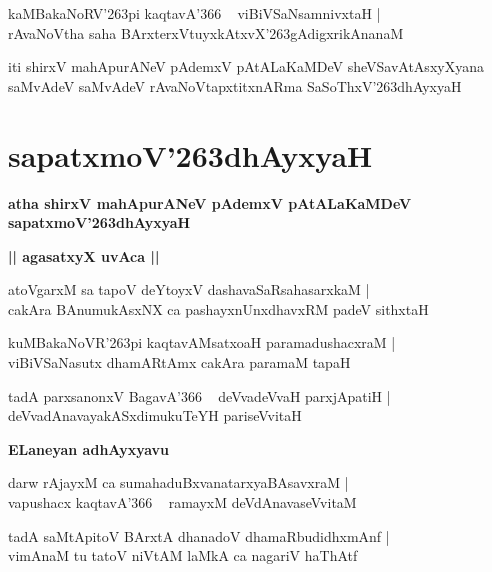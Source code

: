 \documentclass[twoside,12pt,openright]{book}
\def\S{\char'263}
\newcounter{shloka}[chapter]
\def\uvaca#1{\centerline{{\large\textbf{#1}}}}
\begin{document}
\begin{shloka}%
kaMBakaNoRV\S pi kaqtavA\char'366 ~ viBiVSaNsamnivxtaH |\\
rAvaNoVtha saha BArxterxVtuyxkAtxvX\S gAdigxrikAnanaM 
\end{shloka}

\begin{center}
iti shirxV mahApurANeV pAdemxV pAtALaKaMDeV sheVSavAtAsxyXyana saMvAdeV 
saMvAdeV rAvaNoVtapxtitxnARma SaSoThxV\S dhAyxyaH
\end{center}

\chapter{sapatxmoV\S dhAyxyaH}

\begin{center}
{\LARGE\bfseries atha shirxV mahApurANeV pAdemxV pAtALaKaMDeV sapatxmoV\S dhAyxyaH}
\end{center}

\uvaca{|| agasatxyX uvAca ||}

\begin{shloka}%
atoVgarxM sa tapoV deYtoyxV dashavaSaRsahasarxkaM |\\
cakAra BAnumukAsxNX ca pashayxnUnxdhavxRM padeV sithxtaH 
\end{shloka}

\begin{shloka}%
kuMBakaNoVR\S pi kaqtavAMsatxoaH paramadushacxraM |\\
viBiVSaNasutx dhamARtAmx cakAra paramaM tapaH 
\end{shloka}

\begin{shloka}%
tadA parxsanonxV BagavA\char'366 ~ deVvadeVvaH parxjApatiH |\\
deVvadAnavayakASxdimukuTeYH pariseVvitaH
\end{shloka}

\uvaca{ ELaneyan adhAyxyavu }

\begin{shloka}%
darw rAjayxM ca sumahaduBxvanatarxyaBAsavxraM |\\
vapushacx kaqtavA\char'366 ~ ramayxM deVdAnavaseVvitaM 
\end{shloka}

\begin{shloka}%
tadA saMtApitoV BArxtA dhanadoV dhamaRbudidhxmAnf |\\
vimAnaM tu tatoV niVtAM laMkA ca nagariV haThAtf
\end{shloka}
\end{document}
